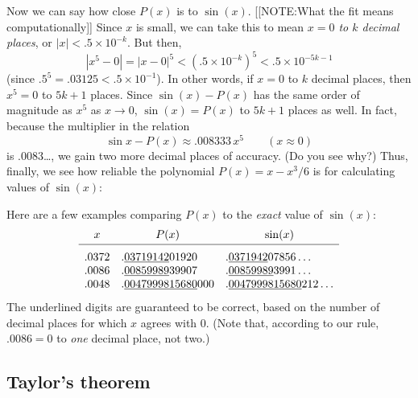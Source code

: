 Now we can say how close $P(x)$ is to $\sin(x)$.  
[[NOTE:What the fit means computationally]]        
Since $x$ is small, we can take this to mean {\em $x = 0$ to $k$
  decimal places}, or $|x| < .5 \times 10^{-k}$.  But then,
\[
|x^5 - 0| = |x - 0|^5 < (.5 \times 10^{-k})^5 < .5 \times 10^{-5k - 1}
\]
(since $.5^5 = .03125 < .5 \times 10^{-1}$).  In other words, if $x =
0$ to $k$ decimal places, then $x^5 = 0$ to $5k + 1$ places.  Since
$\sin(x) - P(x)$ has the same order of magnitude as $x^5$ as $x \to
0$, $\sin(x) = P(x)$ to $5k + 1$ places as well.  In fact, because the
multiplier in the relation
\[
\sin{x} - P(x) \approx .008333 \, x^5 \qquad  (x \approx 0)
\]
is .0083\ldots , we gain two more decimal places of accuracy.  (Do you
see why?)  Thus, finally, we see how reliable the polynomial $P(x) = x
- x^3/6$ is for calculating values of $\sin(x)$:
\begin{center}
\end{center}
Here are a few examples comparing $P(x)$ to the {\em exact\/} value of $\sin(x)$:
{\small
\addtolength{\arraycolsep}{8pt}
        \[
\begin{array}{lll}
        \multicolumn{1}{c}{x} & \multicolumn{1}{c}{P(x)} &
                \multicolumn{1}{c}{\sin(x)} \\[2pt]
        \hline
        .0372   &  .\underline{03719142}01920 & 
             .\underline{0371942}07856\ldots \rule{0pt}{14pt} \\
        .0086   & .\underline{00859989}39907 &
             .\underline{00859989}3991\ldots \\
        .0048   & .\underline{0047999815680}000 &
                 .\underline{0047999815680}212\ldots
        \end{array}
\] 
} 
The underlined digits are guaranteed to be correct, based on the
number of decimal places for which $x$ agrees with 0.  (Note that,
according to our rule, $.0086 = 0$ to {\em one\/} decimal place, not
two.)\label{endsine}

\subsection{Taylor's theorem}
\label{subsec:taylors-theorem}


